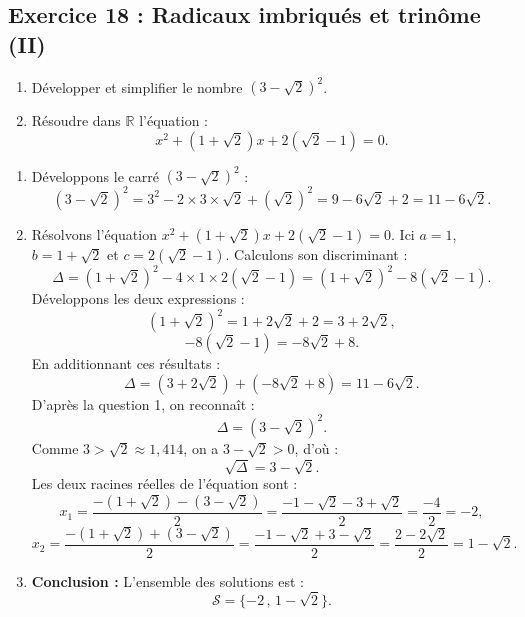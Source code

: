 \documentclass[11pt,a4paper]{article}
\newcommand{\R}{\mathbb{R}}
\begin{document}
\subsection*{Exercice 18 : Radicaux imbriqués et trinôme (II)}
\begin{enumerate}
    \item Développer et simplifier le nombre $(3 - \sqrt{2})^2$.
    \item Résoudre dans $\R$ l'équation :
    \[
    x^2 + (1 + \sqrt{2})x + 2(\sqrt{2} - 1) = 0.
    \]
\end{enumerate}

\begin{correctionbox}
\begin{enumerate}
    \item Développons le carré $(3 - \sqrt{2})^2$ :
    \[
    (3 - \sqrt{2})^2 = 3^2 - 2 \times 3 \times \sqrt{2} + (\sqrt{2})^2 = 9 - 6\sqrt{2} + 2 = 11 - 6\sqrt{2}.
    \]

    \item Résolvons l'équation $x^2 + (1 + \sqrt{2})x + 2(\sqrt{2} - 1) = 0$.
    Ici $a = 1$, $b = 1 + \sqrt{2}$ et $c = 2(\sqrt{2} - 1)$.
    Calculons son discriminant :
    \[
    \Delta = (1 + \sqrt{2})^2 - 4 \times 1 \times 2(\sqrt{2} - 1) = (1 + \sqrt{2})^2 - 8(\sqrt{2} - 1).
    \]
    Développons les deux expressions :
    \[
    (1 + \sqrt{2})^2 = 1 + 2\sqrt{2} + 2 = 3 + 2\sqrt{2},
    \]
    \[
    -8(\sqrt{2} - 1) = -8\sqrt{2} + 8.
    \]
    En additionnant ces résultats :
    \[
    \Delta = (3 + 2\sqrt{2}) + (-8\sqrt{2} + 8) = 11 - 6\sqrt{2}.
    \]
    D'après la question 1, on reconnaît :
    \[
    \Delta = (3 - \sqrt{2})^2.
    \]
    Comme $3 > \sqrt{2} \approx 1{,}414$, on a $3 - \sqrt{2} > 0$, d'où :
    \[
    \sqrt{\Delta} = 3 - \sqrt{2}.
    \]
    Les deux racines réelles de l'équation sont :
    \[
    x_1 = \frac{-(1 + \sqrt{2}) - (3 - \sqrt{2})}{2} = \frac{-1 - \sqrt{2} - 3 + \sqrt{2}}{2} = \frac{-4}{2} = -2,
    \]
    \[
    x_2 = \frac{-(1 + \sqrt{2}) + (3 - \sqrt{2})}{2} = \frac{-1 - \sqrt{2} + 3 - \sqrt{2}}{2} = \frac{2 - 2\sqrt{2}}{2} = 1 - \sqrt{2}.
    \]

    \item \textbf{Conclusion :}
    L'ensemble des solutions est :
    \[
    \mathcal{S} = \{-2\,,\, 1 - \sqrt{2}\}.
    \]
\end{enumerate}
\end{correctionbox}
\end{document}
